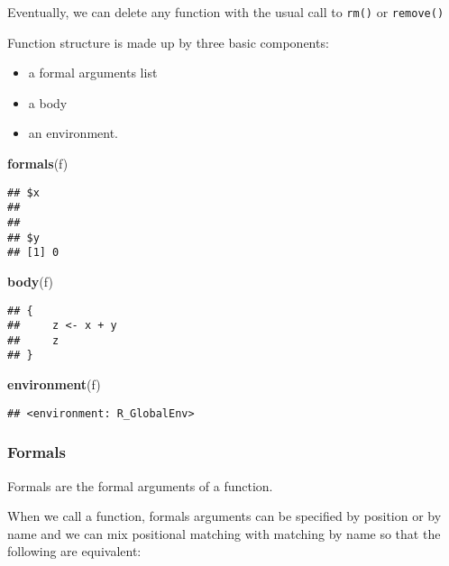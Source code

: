 \documentclass[]{book}
\newenvironment{Shaded}{\begin{snugshade}}{\end{snugshade}}
\newcommand{\KeywordTok}[1]{\textcolor[rgb]{0.13,0.29,0.53}{\textbf{{#1}}}}
\newcommand{\NormalTok}[1]{{#1}}
\providecommand{\tightlist}{%
  \setlength{\itemsep}{0pt}\setlength{\parskip}{0pt}}
\def\tightlist{}
\begin{document}
Eventually, we can delete any function with the usual call to
\texttt{rm()} or \texttt{remove()}

Function structure is made up by three basic components:

\begin{itemize}
\tightlist
\item
  a formal arguments list
\item
  a body
\item
  an environment.
\end{itemize}

\begin{Shaded}
\begin{Highlighting}[]
\KeywordTok{formals}\NormalTok{(f)}
\end{Highlighting}
\end{Shaded}

\begin{verbatim}
## $x
## 
## 
## $y
## [1] 0
\end{verbatim}

\begin{Shaded}
\begin{Highlighting}[]
\KeywordTok{body}\NormalTok{(f)}
\end{Highlighting}
\end{Shaded}

\begin{verbatim}
## {
##     z <- x + y
##     z
## }
\end{verbatim}

\begin{Shaded}
\begin{Highlighting}[]
\KeywordTok{environment}\NormalTok{(f)}
\end{Highlighting}
\end{Shaded}

\begin{verbatim}
## <environment: R_GlobalEnv>
\end{verbatim}

\subsubsection{Formals}\label{formals}

Formals are the formal arguments of a function.

When we call a function, formals arguments can be specified by position
or by name and we can mix positional matching with matching by name so
that the following are equivalent:
\end{document}
